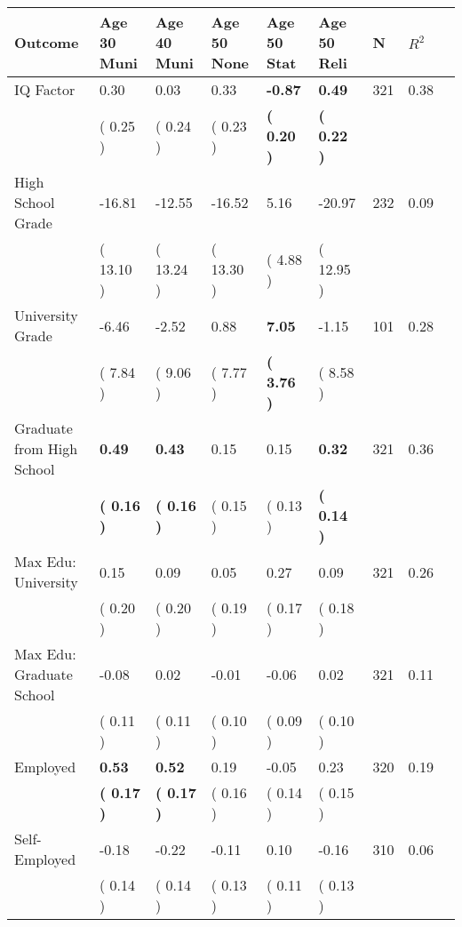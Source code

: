 \begin{tabular}{L{6.2cm} C{1.8cm} C{1.8cm} C{1.8cm} C{1.8cm} C{1.8cm} C{1.8cm} C{0.3cm} C{0.3cm}}
\toprule
 \textbf{Outcome} & \textbf{Age 30 Muni} & \textbf{Age 40 Muni} & \textbf{Age 50 None} & \textbf{Age 50 Stat} & \textbf{Age 50 Reli} & \textbf{N} & \textbf{$ R^2$} \\
\midrule
IQ Factor &      0.30 &      0.03 &      0.33 & \textbf{    -0.87} & \textbf{     0.49}  & 321 &       0.38 \\ 
 & (     0.25 ) & (     0.24 ) & (     0.23 ) & \textbf{(     0.20 )} & \textbf{(     0.22 )}  & \\
High School Grade &    -16.81 &    -12.55 &    -16.52 &      5.16 &    -20.97  & 232 &       0.09 \\ 
 & (    13.10 ) & (    13.24 ) & (    13.30 ) & (     4.88 ) & (    12.95 )  & \\
University Grade &     -6.46 &     -2.52 &      0.88 & \textbf{     7.05} &     -1.15  & 101 &       0.28 \\ 
 & (     7.84 ) & (     9.06 ) & (     7.77 ) & \textbf{(     3.76 )} & (     8.58 )  & \\
Graduate from High School & \textbf{     0.49} & \textbf{     0.43} &      0.15 &      0.15 & \textbf{     0.32}  & 321 &       0.36 \\ 
 & \textbf{(     0.16 )} & \textbf{(     0.16 )} & (     0.15 ) & (     0.13 ) & \textbf{(     0.14 )}  & \\
Max Edu: University &      0.15 &      0.09 &      0.05 &      0.27 &      0.09  & 321 &       0.26 \\ 
 & (     0.20 ) & (     0.20 ) & (     0.19 ) & (     0.17 ) & (     0.18 )  & \\
Max Edu: Graduate School &     -0.08 &      0.02 &     -0.01 &     -0.06 &      0.02  & 321 &       0.11 \\ 
 & (     0.11 ) & (     0.11 ) & (     0.10 ) & (     0.09 ) & (     0.10 )  & \\
Employed & \textbf{     0.53} & \textbf{     0.52} &      0.19 &     -0.05 &      0.23  & 320 &       0.19 \\ 
 & \textbf{(     0.17 )} & \textbf{(     0.17 )} & (     0.16 ) & (     0.14 ) & (     0.15 )  & \\
Self-Employed &     -0.18 &     -0.22 &     -0.11 &      0.10 &     -0.16  & 310 &       0.06 \\ 
 & (     0.14 ) & (     0.14 ) & (     0.13 ) & (     0.11 ) & (     0.13 )  & \\

\end{tabular}
